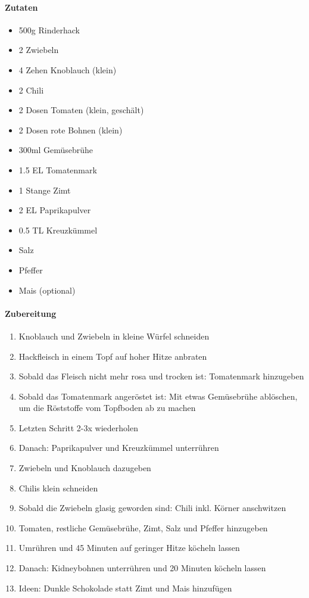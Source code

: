 \newpage
{}

\paragraph{Zutaten}
\begin{itemize}[noitemsep]
	\item 500g Rinderhack
	\item 2 Zwiebeln
	\item 4 Zehen Knoblauch (klein)
	\item 2 Chili
	\item 2 Dosen Tomaten (klein, geschält)
	\item 2 Dosen rote Bohnen (klein)
	\item 300ml Gemüsebrühe
	\item 1.5 EL Tomatenmark
	\item 1 Stange Zimt
	\item 2 EL Paprikapulver
	\item 0.5 TL Kreuzkümmel
	\item Salz
	\item Pfeffer
	\item Mais (optional)
\end{itemize}

\paragraph{Zubereitung}
\begin{enumerate}[noitemsep]
	\item Knoblauch und Zwiebeln in kleine Würfel schneiden
	\item Hackfleisch in einem Topf auf hoher Hitze anbraten
	\item Sobald das Fleisch nicht mehr rosa und trocken ist: Tomatenmark hinzugeben
	\item Sobald das Tomatenmark angeröstet ist: Mit etwas Gemüsebrühe ablöschen, um die Röststoffe vom Topfboden ab zu machen
	\item Letzten Schritt 2-3x wiederholen
	\item Danach: Paprikapulver und Kreuzkümmel unterrühren
	\item Zwiebeln und Knoblauch dazugeben
	\item Chilis klein schneiden 
	\item Sobald die Zwiebeln glasig geworden sind: Chili inkl. Körner anschwitzen
	\item Tomaten, restliche Gemüsebrühe, Zimt, Salz und Pfeffer hinzugeben
	\item Umrühren und 45 Minuten auf geringer Hitze köcheln lassen
	\item Danach: Kidneybohnen unterrühren und 20 Minuten köcheln lassen
	\item Ideen: Dunkle Schokolade statt Zimt und Mais hinzufügen
\end{enumerate}